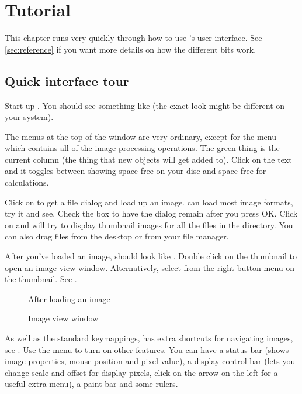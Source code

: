 \chapter{Tutorial}

This chapter runs very quickly through how to use \nip{}'s user-interface. See
\cref{sec:reference} if you want more details on how the different bits work.

\section{Quick interface tour}

Start up \nip{}. You should see something like  (the
exact look might be different on your system).

The menus at the top of the window are very ordinary, except for the
 menu which contains all of the image processing operations.
The green thing is the current column (the thing that new objects will get
added to). Click on the  text and it toggles between showing
space free on your disc and space free for calculations.

Click on  to get a file dialog and load up an
image. \nip{} can load most image formats, try it and see.  Check the
 box to have the dialog remain after you press OK. Click on
 and \nip{} will try to display thumbnail images for
all the files in the directory. You can also drag files from the desktop or
from your file manager.

After you've loaded an image, \nip{} should look like .
Double click on the thumbnail to open an image view window. Alternatively,
select  from the right-button menu on the thumbnail. See
.

\begin{figure}
\caption{After loading an image}
\end{figure}

\begin{figure}
\caption{Image view window}
\end{figure}

As well as the standard keymappings, \nip{} has extra shortcuts for
navigating images, see .  Use the 
menu to turn on other features. You can have a status bar (shows image
properties, mouse position and pixel value), a display control bar (lets
you change scale and offset for display pixels, click on the arrow on the
left for a useful extra menu), a paint bar and some rulers.

